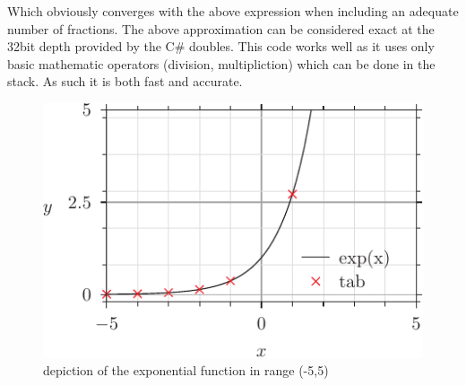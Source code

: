 \documentclass[twocolumn,a4paper]{article}
\begin{document}
Which obviously converges with the above expression when including an adequate number of fractions. The above approximation can be considered exact at the 32bit depth provided by the C\# doubles. This code works well as it uses only basic mathematic operators (division, multipliction) which can be done in the stack. As such it is both fast and accurate.
\begin{figure}[h!]\label{fig:exp}
	\includegraphics[width=\linewidth]{ex_pyx.pdf}
	\caption{depiction of the exponential function in range (-5,5)}
\end{figure}
\end{document}
